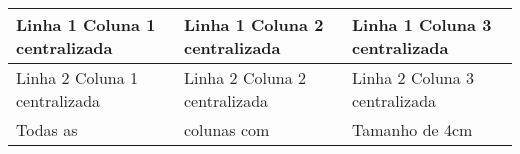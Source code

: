 \documentclass{article}
\begin{document}

	\begin{tabular}{|>{\centering\arraybackslash}m{4cm}|>{\centering\arraybackslash}m{4cm}|>{\centering\arraybackslash}m{4cm}|}
		\hline
		Linha 1 Coluna 1 centralizada & Linha 1 Coluna 2 centralizada & Linha 1 Coluna 3 centralizada \\
		\hline
		Linha 2 Coluna 1 centralizada & Linha 2 Coluna 2 centralizada & Linha 2 Coluna 3 centralizada \\
  		\hline
		Todas as & colunas com & Tamanho de 4cm \\
		\hline
	\end{tabular}
	
\end{document}
